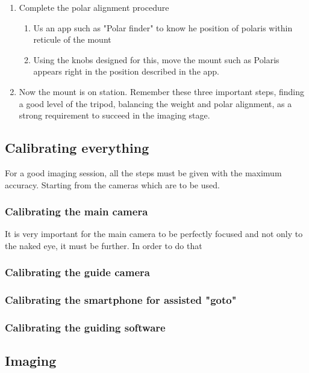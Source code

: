 \documentclass[a4paper,landscape,english,12pt]{article}
\begin{document}
\begin{multicols}{2}
\begin{enumerate}
	\item Complete the polar alignment procedure
	\begin{enumerate}
		\item Us an app such as "Polar finder" to know he position of polaris within reticule of the mount
		\item Using the knobs designed for this, move the mount such as Polaris appears right in the position described in the app.
		\end{enumerate}
	\item Now the mount is on station. Remember these three important steps, finding a good level of the tripod, balancing the weight and polar alignment, as a strong requirement to succeed in the imaging stage.
\end{enumerate}

\newpage\subsection{Calibrating everything}

For a good imaging session, all the steps must be given with the maximum accuracy. Starting from the cameras which are to be used. 

\subsubsection{Calibrating the main camera }

It is very important for the main camera to be perfectly focused and not only to the naked eye, it must be further. In order to do that

\subsubsection{Calibrating the guide camera }

\subsubsection{Calibrating the smartphone for assisted "goto"}

\subsubsection{Calibrating the guiding software}


\subsection{Imaging}



\end{multicols}
\end{document}
